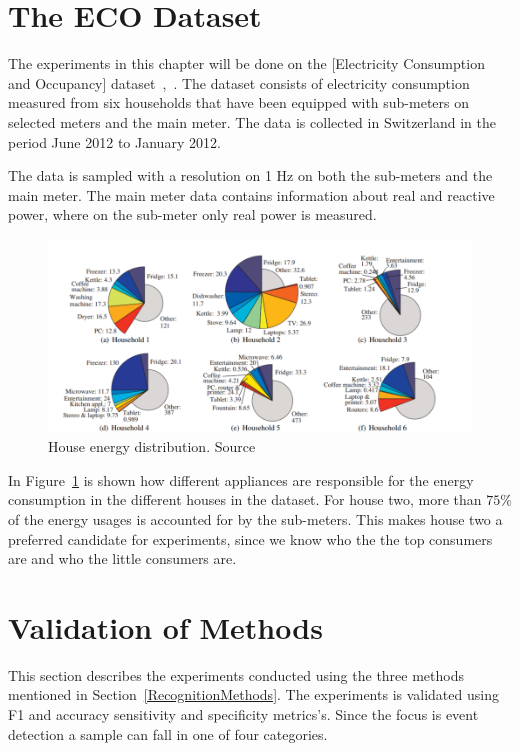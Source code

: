\section{The ECO Dataset}
The experiments in this chapter will be done on the [Electricity Consumption and Occupancy] dataset~\citep{RefWorks:26},~\citep{RefWorks:27}. The dataset consists of electricity consumption measured from six households that have been equipped with sub-meters on selected meters and the main meter. The data is collected in Switzerland in the period June 2012 to January 2012. 

The data is sampled with a resolution on 1 Hz on both the sub-meters and the main meter. The main meter data contains information about real and reactive power, where on the sub-meter only real power is measured. 

\begin{figure}[H]
\centering
\includegraphics[width=1\textwidth]{billeder/ECOHouses.png}
\caption[House energy distribution.]{House energy distribution. Source \citep{RefWorks:26}}
\label{fig:EHD}
\end{figure}

In Figure~\ref{fig:EHD} is shown how different appliances are responsible for the energy consumption in the different houses in the  dataset. For house two, more than $75\%$ of the energy usages is accounted for by the sub-meters. This makes house two a preferred candidate for experiments, since we know who the the top consumers are and who the little consumers are.  

\section{Validation of Methods} 
\label{sec:VOM}
This section describes the experiments conducted using the three methods mentioned in Section~\ref{RecognitionMethods}. The experiments is validated using F1 and accuracy sensitivity and specificity metrics's. Since the focus is event detection a sample can fall in one of four categories. 

